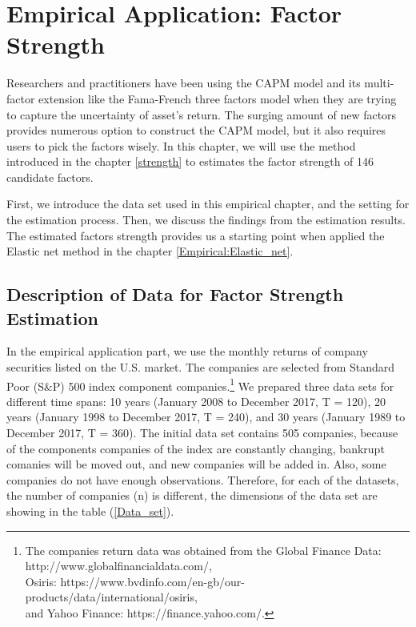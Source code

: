 \chapter{Empirical Application: Factor Strength}\label{Empirical:factor_strength}
	
Researchers and practitioners have been using the CAPM model \cite{Sharpe1964, Lintner1965, Black1972} and its multi-factor extension like the Fama-French three factors model \cite{Fama1992} when they are trying to capture the uncertainty of asset's return.
The surging amount of new factors \cite{Harvey2019} provides numerous option to construct the CAPM model, but it also requires users to pick the factors wisely.
In this chapter, we will use the method introduced in the chapter \ref{strength} to estimates the factor strength of 146 candidate factors.

First, we introduce the data set used in this empirical chapter, and the setting for the estimation process.
Then, we discuss the findings from the estimation results.
The estimated factors strength provides us a starting point when applied the Elastic net method in the chapter \ref{Empirical:Elastic_net}.

	\section{Description of Data for Factor Strength Estimation}\label{data}
	

In the empirical application part, we use the monthly returns of company securities listed on the U.S. market.
The companies are selected from Standard Poor (S\&P) 500 index component companies.\footnote{The companies return data was obtained from the Global Finance Data: http://www.globalfinancialdata.com/,\\ Osiris: https://www.bvdinfo.com/en-gb/our-products/data/international/osiris, \\and Yahoo Finance: https://finance.yahoo.com/.}
We prepared three data sets for different time spans: 10 years (January 2008 to December 2017, T = 120), 20 years (January 1998 to December 2017, T  = 240), and 30 years (January 1989 to December 2017, T = 360).
The initial data set contains 505 companies, because of the components companies of the index are constantly changing, bankrupt comanies will be moved out, and new companies will be added in.
Also, some companies do not have enough observations.
Therefore, for each of the datasets, the number of companies (n) is different, the dimensions of the data set are showing in the table (\ref{Data_set}).

